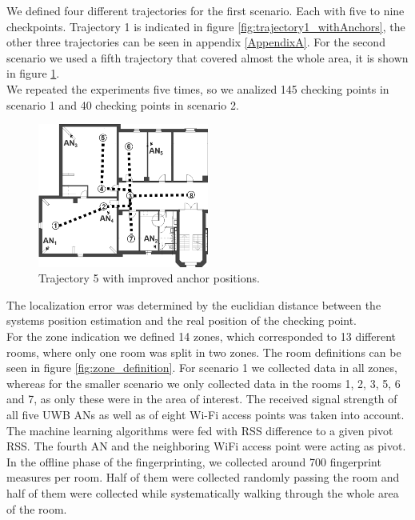 \noindent\hspace*{5mm}%
We defined four different trajectories for the first scenario. Each with five to nine checkpoints. Trajectory 1 is indicated in figure \ref{fig:trajectory1_withAnchors}, the other three trajectories can be seen in appendix \ref{AppendixA}.
For the second scenario we used a fifth trajectory that covered almost the whole area, it is shown in figure \ref{fig:trajectory5_withAnchors}.\\
\noindent\hspace*{5mm}%
We repeated the experiments five times, so we analized 145 checking points in scenario 1 and 40 checking points in scenario 2.\begin{figure}[th]
\centering
\includegraphics[width=0.5\textwidth]{Figures/trajectory5_withAnchors}
\decoRule
\caption[Trajectory 5]{Trajectory 5 with improved anchor positions.}
\label{fig:trajectory5_withAnchors}
\end{figure}
The localization error was determined by the euclidian distance between the systems position estimation and the real position of the checking point.\\
\noindent\hspace*{5mm}%
For the zone indication we defined 14 zones, which corresponded to 13 different rooms, where only one room was split in two zones. The room definitions can be seen in figure \ref{fig:zone_definition}. For scenario 1 we collected data in all zones, whereas for the smaller scenario we only collected data in the rooms 1, 2, 3, 5, 6 and 7, as only these were in the area of interest. The received signal strength of all five UWB ANs as well as of eight Wi-Fi access points was taken into account. The machine learning algorithms were fed with RSS difference to a given pivot RSS. The fourth AN and the neighboring WiFi access point were acting as pivot. In the offline phase of the fingerprinting, we collected around 700 fingerprint measures per room. Half of them were collected randomly passing the room and half of them were collected while systematically walking through the whole area of the room.
